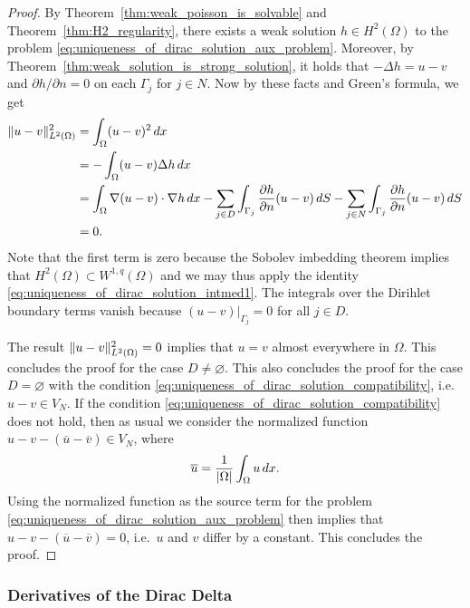 \documentclass[english, 12pt, a4paper, sci, utf8, a-2b, online]{aaltothesis}
\theoremstyle{definition}
\theoremstyle{plain}
\DeclarePairedDelimiter\abs{\lvert}{\rvert}
\DeclarePairedDelimiter\norm{\lVert}{\rVert}
\newcommand*\diff{\mathop{}\!d}
\numberwithin{equation}{section}
\begin{document}
\begin{proof}
    By Theorem~\ref{thm:weak_poisson_is_solvable}
    and Theorem~\ref{thm:H2_regularity}, there exists a weak solution
    $h \in H^2(\Omega)$ to the problem 
    \eqref{eq:uniqueness_of_dirac_solution_aux_problem}.
    Moreover, by Theorem~\ref{thm:weak_solution_is_strong_solution},
    it holds that $-\Delta h = u-v$
    and $\partial h / \partial n = 0$ on each $\Gamma_j$ for $j \in N$.
    Now by these facts and Green's formula, we get
    \begin{align*}
        \norm{u-v}_{L^2(\Omega)}^2
        &= \int_{\Omega} (u-v)^2 \diff x \\
        &= - \int_{\Omega} (u-v) \Delta h  \diff x \\
        &= \int_{\Omega} \nabla (u-v) \cdot \nabla h \diff x
            - \sum_{j \in D} \int_{\Gamma_j}
                \frac{\partial h}{\partial n} (u-v) \diff S
            - \sum_{j \in N} \int_{\Gamma_j}
                \frac{\partial h}{\partial n} (u-v) \diff S \\
        &= 0.
    \end{align*}
    Note that the first term is zero because the Sobolev imbedding theorem
    implies that $H^2(\Omega) \subset W^{1,q}(\Omega)$ and we may thus
    apply the identity \eqref{eq:uniqueness_of_dirac_solution_intmed1}.
    The integrals over the Dirihlet boundary terms vanish because
    $(u-v)|_{\Gamma_j} = 0$ for all $j \in D$.
    
    The result $\norm{u-v}_{L^2(\Omega)}^2 = 0$ implies that $u = v$
    almost everywhere in $\Omega$. This concludes the proof for the
    case $D \neq \varnothing$. This also concludes the proof for the case
    $D = \varnothing$ with the condition 
    \eqref{eq:uniqueness_of_dirac_solution_compatibility}, i.e.\
    $u-v \in V_N$. If the condition 
    \eqref{eq:uniqueness_of_dirac_solution_compatibility} does not hold,
    then as usual we consider the normalized function
    $u-v-(\overline{u} - \overline{v}) \in V_N$, where
    \begin{equation*}
        \overline{u} = \frac{1}{\abs{\Omega}} \int_{\Omega} u \diff x.
    \end{equation*}
    Using the normalized function as the source term for the problem
    \eqref{eq:uniqueness_of_dirac_solution_aux_problem} then
    implies that $u-v-(\overline{u} - \overline{v}) = 0$,
    i.e.\ $u$ and $v$ differ by a constant. This concludes the proof.
\end{proof}

\subsubsection{Derivatives of the Dirac Delta}
\label{subsubsec:derivatives_of_the_dirac_delta}
\end{document}
